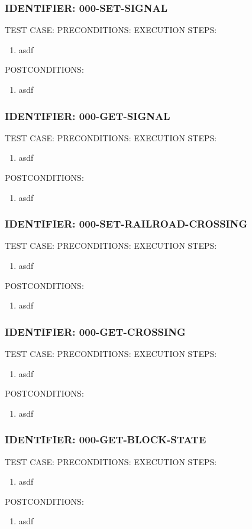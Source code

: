 \documentclass{scrreprt}
\begin{document}
\subsubsection{IDENTIFIER: 000-SET-SIGNAL}
TEST CASE:
PRECONDITIONS:
EXECUTION STEPS:
\begin{enumerate}
	\item asdf
\end{enumerate}
POSTCONDITIONS:
\begin{enumerate}
	\item asdf
\end{enumerate}

\subsubsection{IDENTIFIER: 000-GET-SIGNAL}
TEST CASE:
PRECONDITIONS:
EXECUTION STEPS:
\begin{enumerate}
	\item asdf
\end{enumerate}
POSTCONDITIONS:
\begin{enumerate}
	\item asdf
\end{enumerate}

\subsubsection{IDENTIFIER: 000-SET-RAILROAD-CROSSING}
TEST CASE:
PRECONDITIONS:
EXECUTION STEPS:
\begin{enumerate}
	\item asdf
\end{enumerate}
POSTCONDITIONS:
\begin{enumerate}
	\item asdf
\end{enumerate}

\subsubsection{IDENTIFIER: 000-GET-CROSSING}
TEST CASE:
PRECONDITIONS:
EXECUTION STEPS:
\begin{enumerate}
	\item asdf
\end{enumerate}
POSTCONDITIONS:
\begin{enumerate}
	\item asdf
\end{enumerate}

\subsubsection{IDENTIFIER: 000-GET-BLOCK-STATE}
TEST CASE:
PRECONDITIONS:
EXECUTION STEPS:
\begin{enumerate}
	\item asdf
\end{enumerate}
POSTCONDITIONS:
\begin{enumerate}
	\item asdf
\end{enumerate}
\end{document}
